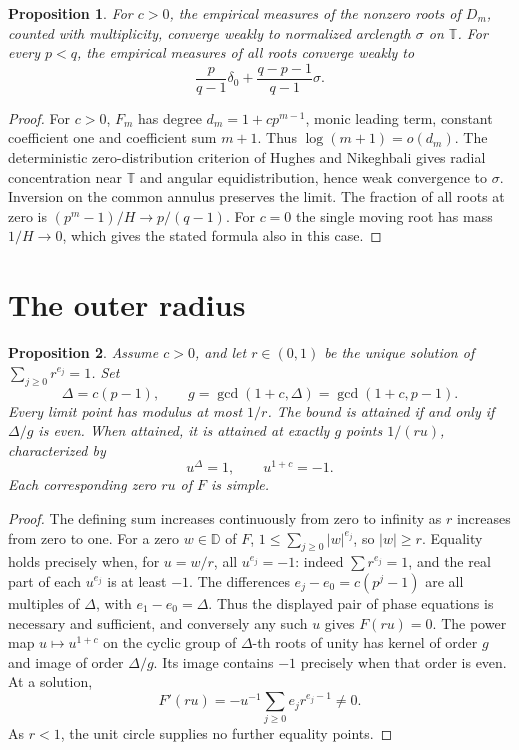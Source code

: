 \documentclass[11pt]{article}
\newtheorem{proposition}{Proposition}[section]
\newcommand{\D}{\mathbb D}
\newcommand{\T}{\mathbb T}
\begin{document}
\begin{proposition}\label{distribution}
For \(c>0\), the empirical measures of the nonzero roots of \(D_m\),
counted with multiplicity, converge weakly to normalized arclength
\(\sigma\) on \(\T\). For every \(p<q\), the empirical measures of
all roots converge weakly to
\[
 \frac{p}{q-1}\delta_0+\frac{q-p-1}{q-1}\sigma .
\]
\end{proposition}
\begin{proof}
For \(c>0\), \(F_m\) has degree \(d_m=1+cp^{m-1}\), monic leading
term, constant coefficient one and coefficient sum \(m+1\). Thus
\(\log(m+1)=o(d_m)\). The deterministic zero-distribution criterion
of Hughes and Nikeghbali \cite{hughes} gives radial concentration
near \(\T\) and angular equidistribution, hence weak convergence to
\(\sigma\). Inversion on the common annulus preserves the limit.
The fraction of all roots at zero is \((p^m-1)/H\to p/(q-1)\).
For \(c=0\) the single moving root has mass \(1/H\to0\), which gives
the stated formula also in this case.
\end{proof}

\section{The outer radius}

\begin{proposition}\label{radius}
Assume \(c>0\), and let \(r\in(0,1)\) be the unique solution of
\(\sum_{j\ge0}r^{e_j}=1\). Set
\[
 \Delta=c(p-1),\qquad g=\gcd(1+c,\Delta)=\gcd(1+c,p-1).
\]
Every limit point has modulus at most \(1/r\). The bound is attained
if and only if \(\Delta/g\) is even. When attained, it is attained at
exactly \(g\) points \(1/(ru)\), characterized by
\[
 u^\Delta=1,\qquad u^{1+c}=-1.
\]
Each corresponding zero \(ru\) of \(F\) is simple.
\end{proposition}
\begin{proof}
The defining sum increases continuously from zero to infinity as
\(r\) increases from zero to one. For a zero \(w\in\D\) of \(F\),
\(1\le\sum_{j\ge0}|w|^{e_j}\), so \(|w|\ge r\).
Equality holds precisely when, for \(u=w/r\), all \(u^{e_j}=-1\):
indeed \(\sum r^{e_j}=1\), and the real part of each \(u^{e_j}\)
is at least \(-1\). The differences \(e_j-e_0=c(p^j-1)\) are all
multiples of \(\Delta\), with \(e_1-e_0=\Delta\). Thus the displayed
pair of phase equations is necessary and sufficient, and conversely
any such \(u\) gives \(F(ru)=0\). The power map \(u\mapsto u^{1+c}\)
on the cyclic group of \(\Delta\)-th roots of unity has kernel
of order \(g\) and image of order \(\Delta/g\). Its image contains
\(-1\) precisely when that order is even. At a solution,
\[
 F'(ru)=-u^{-1}\sum_{j\ge0}e_jr^{e_j-1}\ne0.
\]
As \(r<1\), the unit circle supplies no further equality points.
\end{proof}
\end{document}
